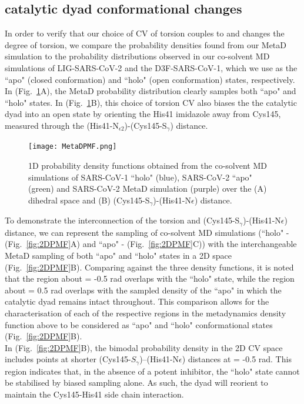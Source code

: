 \subsection{\mpro catalytic dyad conformational changes}

In order to verify that our choice of CV of \dihone torsion couples to and changes the degree of \dihtwo torsion, we compare the probability densities found from our MetaD simulation to the probability distributions observed in our co-solvent MD simulations of LIG-SARS-CoV-2 and the D3F-SARS-CoV-1, which we use as the ``apo" (closed conformation) and ``holo" (open conformation) states, respectively. In (Fig.~\ref{fig:1Dim_PDF}A), the MetaD probability distribution clearly samples both ``apo" and ``holo" states. In (Fig.~\ref{fig:1Dim_PDF}B), this choice of \dihone torsion CV also biases the the catalytic dyad into an open state by orienting the His41 imidazole away from Cys145, measured through the (His41-N$_{\epsilon2}$)-(Cys145-S$_{\gamma}$) distance.\\

\begin{figure}
    \centering
    \texttt{[image: MetaDPMF.png]}
    \caption{1D probability density functions obtained from the co-solvent MD simulations of SARS-CoV-1 ``holo" (blue), SARS-CoV-2 ``apo" (green) and SARS-CoV-2 MetaD simulation (purple) over the (A) \dihtwo dihedral space and (B) (Cys145-S$_{\gamma}$)-(His41-N{$\epsilon$}) distance.} 
    \label{fig:1Dim_PDF}
\end{figure}

To demonstrate the interconnection of the \dihtwo torsion and (Cys145-S$_{\gamma}$)-(His41-N{$\epsilon$}) distance, we can represent the sampling of co-solvent MD simulations (``holo" - (Fig.~\ref{fig:2DPMF}A) and ``apo" - (Fig.~\ref{fig:2DPMF}C)) with the interchangeable MetaD sampling of both ``apo" and ``holo" states in a 2D space (Fig.~\ref{fig:2DPMF}B).  Comparing against the three density functions, it is noted that the region about \dihtwo = -0.5 rad overlaps with the ``holo" state, while the region about \dihtwo = 0.5 rad overlaps with the sampled density of the ``apo" in which the catalytic dyad remains intact throughout. This comparison allows for the characterisation of each of the respective regions in the metadynamics density function above to be considered as ``apo" and ``holo" conformational states (Fig.~\ref{fig:2DPMF}B).\\

In (Fig.~\ref{fig:2DPMF}B), the bimodal probability density in the 2D CV space includes points at shorter (Cys145-$S_{\gamma}$)--(His41-N{$\epsilon$}) distances at \dihtwo = -0.5 rad. This region indicates that, in the absence of a potent inhibitor, the ``holo" state cannot be stabilised by biased \dihone sampling alone. As such, the dyad will reorient to maintain the Cys145-His41 side chain interaction.\\

